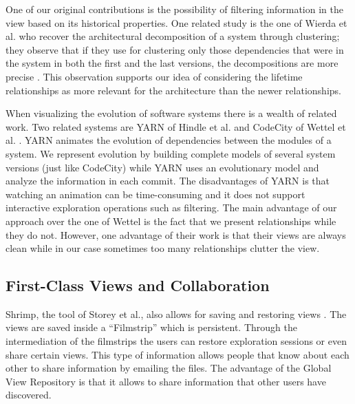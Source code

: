 \documentclass[preprint,12pt]{elsarticle}
\begin{document}
One of our original contributions is the possibility of filtering information in the view based on its historical properties. One related study is the one of Wierda et al. who recover the architectural decomposition of a system through clustering; they observe that if they use for clustering only those dependencies that were in the system in both the first and the last versions, the decompositions are more precise \cite{wierda-clustering}. This observation supports our idea of considering the lifetime relationships as more relevant for the architecture than the newer relationships. 

When visualizing the evolution of software systems there is a wealth of related work. Two related systems are YARN of Hindle et al. \cite{hindle-yarn} and CodeCity of Wettel et al. \cite{wettel-icse11}. YARN animates the evolution of dependencies between the modules of a system. We represent evolution by building complete models of several system versions (just like CodeCity) while YARN uses an evolutionary model and analyze the information in each commit. The disadvantages of YARN is that watching an animation can be time-consuming and it does not support interactive exploration operations such as filtering. The main advantage of our approach over the one of Wettel is the fact that we present relationships while they do not. However, one advantage of their work is that their views are always clean while in our case sometimes too many relationships clutter the view.

\subsection {First-Class Views and Collaboration} 

Shrimp, the tool of Storey et al., also allows for saving and restoring views \cite{rayside-flow}. The views are saved inside a ``Filmstrip'' which is persistent. Through the intermediation of the filmstrips the users can restore exploration sessions or even share certain views. This type of information allows people that know about each other to share information by emailing the files. The advantage of the Global View Repository is that it allows to share information that other users have discovered. 
\end{document}
